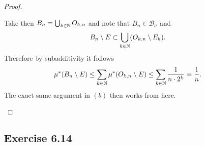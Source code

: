 \documentclass[hw_all.tex]{subfiles}
\begin{document}
\begin{proof}
\begin{enumerate}
            Take then $B_n = \bigcup_{k \in \mathbb{N}} O_{k,n}$ and note that $B_n \in \mathcal{B}_{\sigma}$ and
            \[
                B_n \setminus E \subset \bigcup_{k \in \mathbb{N}} (O_{k,n} \setminus E_k)
            .\]
            Therefore by subadditivity it follows
            \[
                \mu^*(B_n \setminus E) \leq \sum_{k \in \mathbb{N}} \mu^*(O_{k,n} \setminus E) \leq \sum_{k \in \mathbb{N}} \frac{1}{n\cdot 2^k} = \frac{1}{n}
            .\]
            The exact same argument in $(b)$ then works from here.
    \end{enumerate}
\end{proof}

\subsection{Exercise 6.14}
\end{document}
